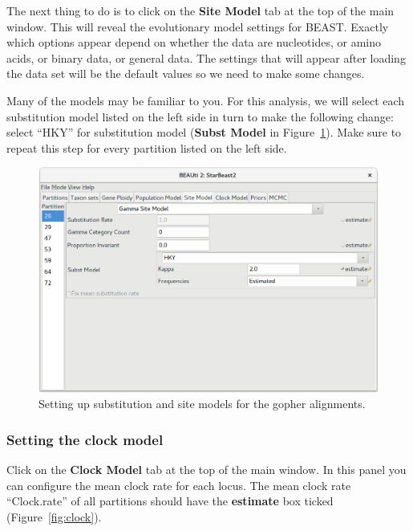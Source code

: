 \documentclass{article}
\begin{document}
The next thing to do is to click on the \textbf{Site Model} tab at the top of
the main window. This will reveal the evolutionary model settings for BEAST.
Exactly which options appear depend on whether the data are nucleotides, or
amino acids, or binary data, or general data. The settings that will appear
after loading the data set will be the default values so we need to make some
changes.

Many of the models may be familiar to you. For this analysis, we will select
each substitution model listed on the left side in turn to make the following
change: select ``HKY'' for substitution model (\textbf{Subst Model} in
Figure~\ref{fig:HKY}). Make sure to repeat this step for every partition listed
on the left side.

\begin{figure}[htb!]
\centering
\includegraphics[width=\textwidth]{figures/beauti-hky.png}
\caption{Setting up substitution and site models for the gopher alignments.}
\label{fig:HKY}
\end{figure}

\subsubsection*{Setting the clock model}

Click on the \textbf{Clock Model} tab at the top of the main window. In this
panel you can configure the mean clock rate for each locus. The
mean clock rate ``Clock.rate'' of all partitions should have the
\textbf{estimate} box ticked (Figure~\ref{fig:clock}).
\end{document}
